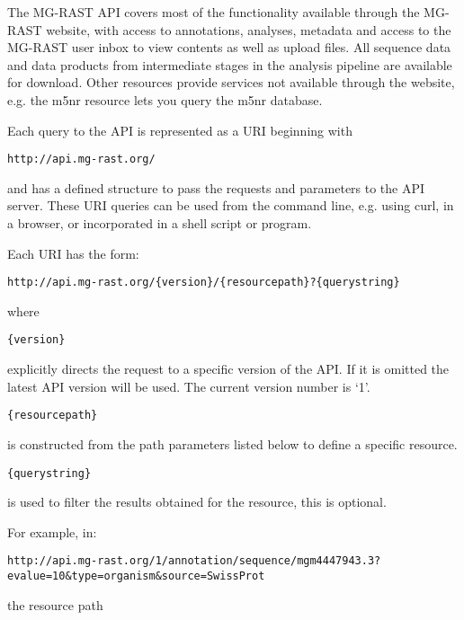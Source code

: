 The MG-RAST API covers most of the functionality available through the MG-RAST website, with access to annotations, analyses, metadata and access to the MG-RAST user inbox to view contents as well as upload files. All sequence data and data products from intermediate stages in the analysis pipeline are available for download. Other resources provide services not available through the website, e.g. the m5nr resource lets you query the m5nr database.

Each query to the API is represented as a URI beginning with 
\begin{small}
\begin{verbatim}
http://api.mg-rast.org/
\end{verbatim}
\end{small} and has a defined structure to pass the requests and parameters to the API server. These URI queries can be used from the command line, e.g. using curl, in a browser, or incorporated in a shell script or program.

Each URI has the form:
\begin{small}
\begin{verbatim}
http://api.mg-rast.org/{version}/{resourcepath}?{querystring}
\end{verbatim}
\end{small} where

\begin{small}
\begin{verbatim}
{version}
\end{verbatim}
\end{small}
explicitly directs the request to a specific version of the API. If it is omitted the latest API version will be used. The current version number is `1'.

\begin{small}
\begin{verbatim}
{resourcepath}
\end{verbatim}
\end{small}
is constructed from the path parameters listed below to define a specific resource.

\begin{small}
\begin{verbatim}
{querystring}
\end{verbatim}
\end{small}
is used to filter the results obtained for the resource, this is optional.

For example, in:
\begin{small}
\begin{lstlisting}
http://api.mg-rast.org/1/annotation/sequence/mgm4447943.3?evalue=10&type=organism&source=SwissProt
\end{lstlisting}
\end{small} the resource path 

